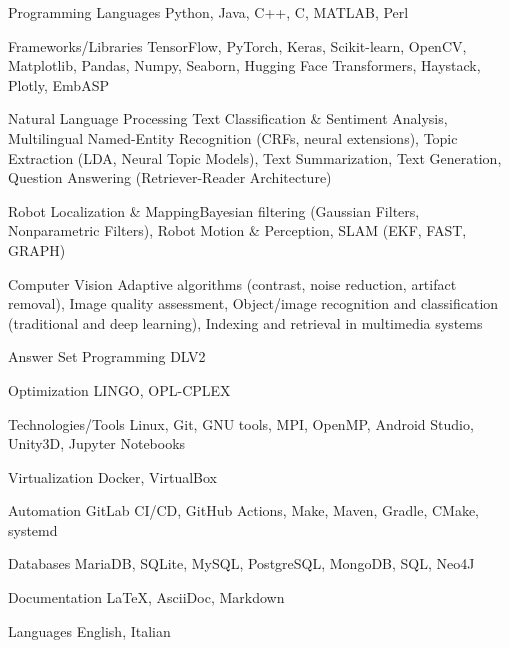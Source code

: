 

\begin{cvskills}

    
    \cvskill
    {Programming Languages}
    {Python, Java, C++, C, MATLAB, Perl}

    \cvskill
    {Frameworks/Libraries}
    {TensorFlow, PyTorch, Keras, Scikit-learn, OpenCV, Matplotlib, Pandas, Numpy, Seaborn, Hugging Face Transformers, Haystack, Plotly, EmbASP}
    
    \cvskill
    {Natural Language Processing}
    {Text Classification \& Sentiment Analysis, Multilingual Named-Entity Recognition (CRFs, neural extensions), Topic Extraction (LDA, Neural Topic Models), Text Summarization, Text Generation, Question Answering (Retriever-Reader Architecture)}

    \cvskill
    {Robot Localization \& Mapping}{Bayesian filtering (Gaussian Filters, Nonparametric Filters), Robot Motion \& Perception, SLAM (EKF, FAST, GRAPH)}    

    \cvskill
    {Computer Vision}
    {Adaptive algorithms (contrast, noise reduction, artifact removal), Image quality assessment, Object/image recognition and classification (traditional and deep learning), Indexing and retrieval in multimedia systems}


    \cvskill
    {Answer Set Programming} %
    {DLV2} %

    \cvskill
    {Optimization} %
    {LINGO, OPL-CPLEX} %

    

    \cvskill
    {Technologies/Tools}
    {Linux, Git, GNU tools, MPI, OpenMP, Android Studio, Unity3D, Jupyter Notebooks}
    
    \cvskill
    {Virtualization}
    {Docker, VirtualBox}
    
    \cvskill
    {Automation}
    {GitLab CI/CD, GitHub Actions, Make, Maven, Gradle, CMake, systemd}
    
    \cvskill
    {Databases}
    {MariaDB, SQLite, MySQL, PostgreSQL, MongoDB, SQL, Neo4J}
    
    \cvskill
    {Documentation}
    {\LaTeX, AsciiDoc, Markdown}
    
    \cvskill
    {Languages} %
    {English, Italian} %

\end{cvskills}
